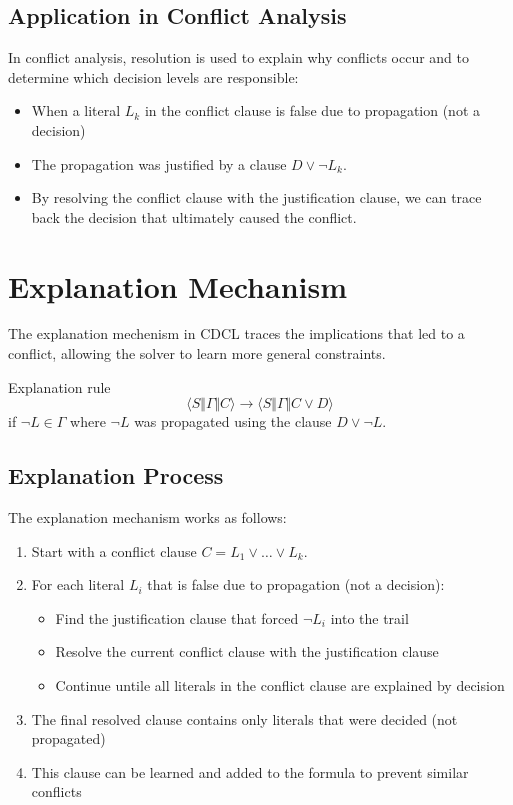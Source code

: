 \documentclass[a4paper]{article}
\theoremstyle{definition}
\begin{document}
\subsection{Application in Conflict Analysis}
In conflict analysis, resolution is used to explain why conflicts occur and to determine which
decision levels are responsible:
\begin{itemize}
    \item When a literal \( L_k \) in the conflict clause is false due to propagation (not a decision)
    \item The propagation was justified by a clause \( D \vee \lnot L_k \).
    \item By resolving the conflict clause with the justification clause, we can trace back the decision that ultimately caused the conflict.
\end{itemize}
\section{Explanation Mechanism}
The explanation mechenism in CDCL traces the implications that led to a conflict,
allowing the solver to learn more general constraints.
\begin{theorem}{Explanation rule}
\centering \[ \langle S \Vert \varGamma \Vert C \rangle \rightarrow \langle S \Vert \varGamma \Vert C \vee D \rangle \]
if \( \lnot L \in \varGamma \) where \( \lnot L \) was propagated using the clause \( D \vee \lnot L \).
\end{theorem}
\subsection{Explanation Process}
The explanation mechanism works as follows:
\begin{enumerate}
    \item Start with a conflict clause \( C = L_1 \vee \ldots \vee L_k \).
    \item For each literal \( L_i \) that is false due to propagation (not a decision):
    \begin{itemize}
        \item Find the justification clause that forced \( \lnot L_i \) into the trail 
        \item Resolve the current conflict clause with the justification clause 
        \item Continue untile all literals in the conflict clause are explained by decision 
    \end{itemize}
    \item The final resolved clause contains only literals that were decided (not propagated)
    \item This clause can be learned and added to the formula to prevent similar conflicts
\end{enumerate}
\end{document}
